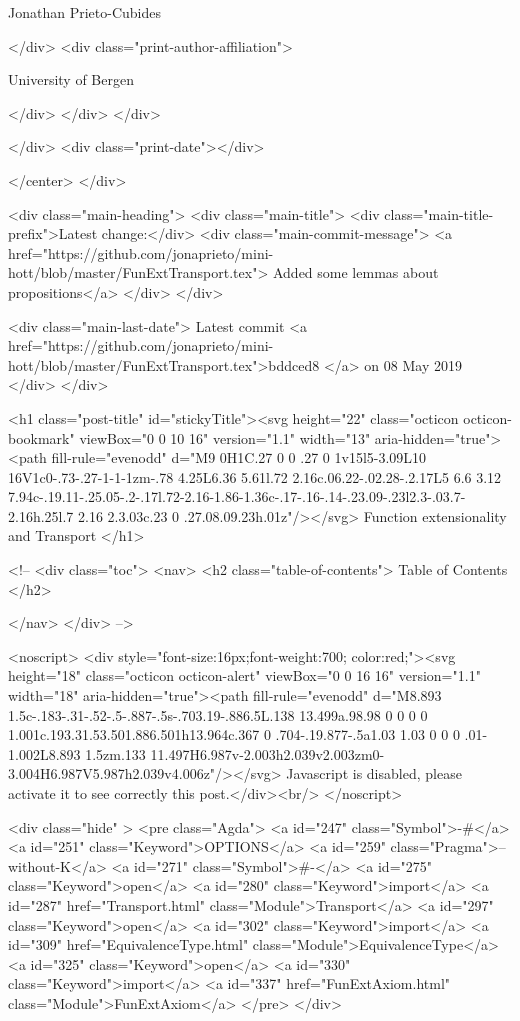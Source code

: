                   Jonathan Prieto-Cubides
                
              </div>
              <div class="print-author-affiliation">
                
                  University of Bergen
                
                </div>
            </div>
          </div>
          
          
        </div>
        <div class="print-date"></div>
        
        
    </center>
  </div>

  
  <div class="main-heading">
    <div class="main-title">
      <div class="main-title-prefix">Latest change:</div>
      <div class="main-commit-message">
            <a href="https://github.com/jonaprieto/mini-hott/blob/master/FunExtTransport.tex">
              Added some lemmas about propositions</a>
      </div>
    </div>

    <div class="main-last-date">
      Latest commit <a href="https://github.com/jonaprieto/mini-hott/blob/master/FunExtTransport.tex">bddced8 </a> on  08 May 2019
    </div>
  </div>
  
  <h1 class="post-title" id="stickyTitle"><svg height="22" class="octicon octicon-bookmark" viewBox="0 0 10 16" version="1.1" width="13" aria-hidden="true"><path fill-rule="evenodd" d="M9 0H1C.27 0 0 .27 0 1v15l5-3.09L10 16V1c0-.73-.27-1-1-1zm-.78 4.25L6.36 5.61l.72 2.16c.06.22-.02.28-.2.17L5 6.6 3.12 7.94c-.19.11-.25.05-.2-.17l.72-2.16-1.86-1.36c-.17-.16-.14-.23.09-.23l2.3-.03.7-2.16h.25l.7 2.16 2.3.03c.23 0 .27.08.09.23h.01z"/></svg> Function extensionality and Transport
  </h1>

  <!-- 
  <div class="toc">
    <nav>
    <h2 class="table-of-contents"> Table of Contents </h2>
      

    </nav>
  </div>
   -->

  <noscript>
  <div style="font-size:16px;font-weight:700; color:red;"><svg height="18" class="octicon octicon-alert" viewBox="0 0 16 16" version="1.1" width="18" aria-hidden="true"><path fill-rule="evenodd" d="M8.893 1.5c-.183-.31-.52-.5-.887-.5s-.703.19-.886.5L.138 13.499a.98.98 0 0 0 0 1.001c.193.31.53.501.886.501h13.964c.367 0 .704-.19.877-.5a1.03 1.03 0 0 0 .01-1.002L8.893 1.5zm.133 11.497H6.987v-2.003h2.039v2.003zm0-3.004H6.987V5.987h2.039v4.006z"/></svg> Javascript is disabled, please activate it to see correctly this post.</div><br/>
  </noscript>

  <div class="hide" >
<pre class="Agda">
<a id="247" class="Symbol">{-#</a> <a id="251" class="Keyword">OPTIONS</a> <a id="259" class="Pragma">--without-K</a> <a id="271" class="Symbol">#-}</a>
<a id="275" class="Keyword">open</a> <a id="280" class="Keyword">import</a> <a id="287" href="Transport.html" class="Module">Transport</a>
<a id="297" class="Keyword">open</a> <a id="302" class="Keyword">import</a> <a id="309" href="EquivalenceType.html" class="Module">EquivalenceType</a>
<a id="325" class="Keyword">open</a> <a id="330" class="Keyword">import</a> <a id="337" href="FunExtAxiom.html" class="Module">FunExtAxiom</a>
</pre>
</div>

